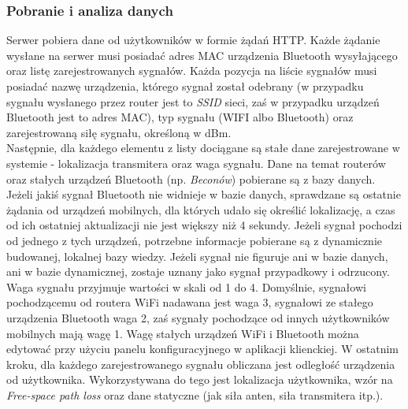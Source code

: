 \subsubsection{Pobranie i analiza danych}
Serwer pobiera dane od użytkowników w formie żądań HTTP. Każde żądanie wysłane na serwer musi posiadać adres MAC urządzenia Bluetooth wysyłającego oraz listę zarejestrowanych sygnałów. Każda pozycja na liście sygnałów musi posiadać nazwę urządzenia, którego sygnał został odebrany (w przypadku sygnału wysłanego przez router jest to \textit{SSID} sieci, zaś w przypadku urządzeń Bluetooth jest to adres MAC), typ sygnału (WIFI albo Bluetooth) oraz zarejestrowaną siłę sygnału, określoną w dBm. \\
Następnie, dla każdego elementu z listy dociągane są stałe dane zarejestrowane w systemie - lokalizacja transmitera oraz waga sygnału. Dane na temat routerów oraz stałych urządzeń Bluetooth (np. \textit{Beconów}) pobierane są z bazy danych. Jeżeli jakiś sygnał Bluetooth nie widnieje w bazie danych, sprawdzane są ostatnie żądania od urządzeń mobilnych, dla których udało się określić lokalizację, a czas od ich ostatniej aktualizacji nie jest większy niż 4 sekundy. Jeżeli sygnał pochodzi od jednego z tych urządzeń, potrzebne informacje pobierane są z dynamicznie budowanej, lokalnej bazy wiedzy. Jeżeli sygnał nie figuruje ani w bazie danych, ani w bazie dynamicznej, zostaje uznany jako sygnał przypadkowy i odrzucony. Waga sygnału przyjmuje wartości w skali od 1 do 4. Domyślnie, sygnałowi pochodzącemu od routera WiFi nadawana jest waga 3, sygnałowi ze stałego urządzenia Bluetooth waga 2, zaś sygnały pochodzące od innych użytkowników mobilnych mają wagę 1. Wagę stałych urządzeń WiFi i Bluetooth można edytować przy użyciu panelu konfiguracyjnego w aplikacji klienckiej. W ostatnim kroku, dla każdego zarejestrowanego sygnału obliczana jest odległość urządzenia od użytkownika. Wykorzystywana do tego jest lokalizacja użytkownika, wzór na \textit{Free-space path loss} oraz dane statyczne (jak siła anten, siła transmitera itp.).\\
